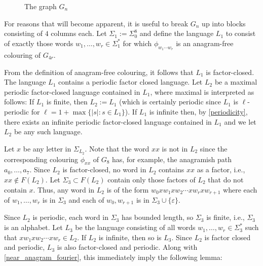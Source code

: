 \documentclass{patmorin}
\DeclareMathOperator{\afcn}{\dot{\chi}_\pi}
\begin{document}
\begin{figure}
    \caption{The graph $G_n$}
    \label{g_n}
\end{figure}



For reasons that will become apparent, it is useful to break $G_n$ up into blocks consisting of $4$ columns each.  Let $\Sigma_1:=\Sigma_0^8$ and define the language $L_1$ to consist of exactly those words $w_1,\ldots,w_r\in \Sigma_1^*$ for which $\phi_{w_1\cdots w_r}$ is an anagram-free colouring of $G_{4r}$.

From the definition of anagram-free colouring, it follows that $L_1$ is factor-closed.  The language $L_1$ contains a periodic factor closed language. Let $L_2$ be a maximal periodic factor-closed language contained in $L_1$, where maximal is interpreted as follows: If $L_1$ is finite, then $L_2:=L_1$ (which is certainly periodic since $L_1$ is $\ell$-periodic for $\ell=1+\max\{|s|:s\in L_1\}$).  If $L_1$ is infinite then, by \cref{periodicity}, there exists an infinite periodic factor-closed language contained in $L_1$ and we let $L_2$ be any such language.  

Let $x$ be any letter in $\Sigma_{L_2}$.  Note that the word $xx$ is not in $L_2$ since the corresponding colouring $\phi_{xx}$ of $G_8$ has, for example, the anagramish path $a_0,\ldots,a_7$.  Since $L_2$ is factor-closed, no word in $L_2$ contains $xx$ as a factor, i.e., $xx\not\in F(L_2)$.  Let $\Sigma_3\subset F(L_2)$ contain only those factors of $L_2$ that do not contain $x$.  Thus, any word in $L_2$ is of the form $w_0xw_1xw_2\cdots xw_rxw_{r+1}$ where each of $w_1,\ldots,w_{r}$ is in $\Sigma_3$ and each of $w_0,w_{r+1}$ is in $\Sigma_3\cup\{\varepsilon\}$.  

Since $L_2$ is periodic, each word in $\Sigma_3$ has bounded length, so $\Sigma_3$ is finite, i.e., $\Sigma_3$ is an alphabet.  Let $L_3$ be the language consisting of all words $w_1,\ldots,w_r\in\Sigma_3^*$ such that $xw_1xw_2\cdots xw_r\in L_2$.  If $L_2$ is infinite, then so is $L_3$.  Since $L_2$ is factor closed and periodic, $L_3$ is also factor-closed and periodic. Along with \cref{near_anagram_fourier}, this immediately imply the following lemma:
\end{document}
